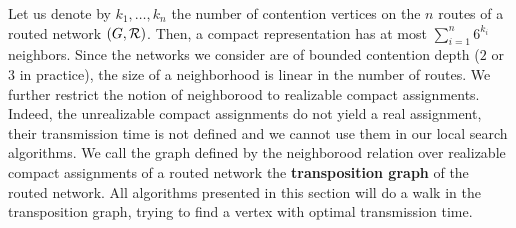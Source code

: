 \documentclass[english]{article}
\begin{document}
% 
% 
% 
% 
% 

 Let us denote by $k_1,\ldots,k_n$ the number of contention vertices on the $n$ routes of 
 a routed network $(G,\cal{R})$. Then, a compact representation has at most $\sum_{i=1}^n 6^{k_i}$ neighbors. Since the networks we consider are of bounded contention depth ($2$ or $3$ in practice), the size of a neighborhood is linear in the number of routes.  We further restrict the notion of neighborood to realizable compact assignments. Indeed, the unrealizable compact assignments do not yield a real assignment, their transmission time is not defined and we cannot use them in our local search algorithms. We call the graph defined by the neighborood relation over realizable compact assignments of a routed network the \textbf{transposition graph} of the routed network. 
  All algorithms presented in this section will do a walk in the transposition graph, trying to find a vertex with optimal
  transmission time. 
\end{document}
